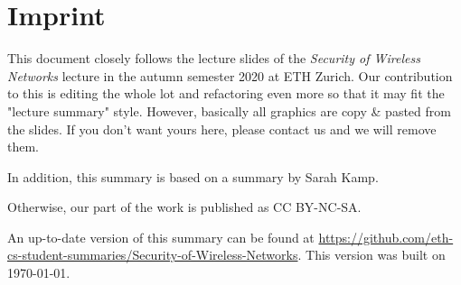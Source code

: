 %
%
\appendix


\section{Imprint}

This document closely follows the lecture slides of the \textit{Security of Wireless Networks} lecture in the autumn semester 2020 at ETH Zurich.
Our contribution to this is editing the whole lot and refactoring even more so that it may fit the "lecture summary" style.
However, basically all graphics are copy \& pasted from the slides. If you don't want yours here, please contact us and we will remove them.

In addition, this summary is based on a summary by Sarah Kamp.

Otherwise, our part of the work is published as CC BY-NC-SA.

An up-to-date version of this summary can be found at \url{https://github.com/eth-cs-student-summaries/Security-of-Wireless-Networks}.
This version was built on \today.



%
%